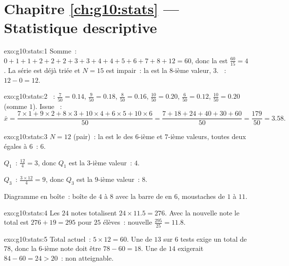 \section*{Chapitre \ref{ch:g10:stats} --- Statistique descriptive}

\begin{solution}{exo:g10:stats:1}
Somme~: $0+1+1+2+2+2+3+3+4+4+5+6+7+8+12 = 60$, donc la  est
$\frac{60}{15} = 4$. La série est déjà triée et $N = 15$ est impair~: la
 est la $8$-ième valeur, $3$. ~: $12 - 0 = 12$.
\end{solution}

\begin{solution}{exo:g10:stats:2}
~: $\frac{7}{50} = 0.14$, $\frac{9}{50} = 0.18$,
$\frac{8}{50} = 0.16$, $\frac{10}{50} = 0.20$, $\frac{6}{50} = 0.12$,
$\frac{10}{50} = 0.20$ (somme $1$). Issue ~:
\[
\bar x = \frac{7 \times 1 + 9 \times 2 + 8 \times 3 + 10 \times 4
+ 6 \times 5 + 10 \times 6}{50}
= \frac{7 + 18 + 24 + 40 + 30 + 60}{50}
= \frac{179}{50} = 3.58 .
\]
\end{solution}

\begin{solution}{exo:g10:stats:3}
$N = 12$ (pair)~: la  est le  des $6$-ième et $7$-ième
valeurs, toutes deux égales à $6$~:  $6$.

$Q_1$~: $\frac{12}{4} = 3$, donc $Q_1$ est la $3$-ième valeur~: $4$.

$Q_3$~: $\frac{3 \times 12}{4} = 9$, donc $Q_3$ est la $9$-ième
valeur~: $8$.

Diagramme en boîte~: boîte de $4$ à $8$ avec la barre de  en $6$,
moustaches de $1$ à $11$.
\end{solution}

\begin{solution}{exo:g10:stats:4}
Les $24$ notes totalisent $24 \times 11.5 = 276$. Avec la nouvelle note
le total est $276 + 19 = 295$ pour $25$ élèves~: nouvelle 
$\frac{295}{25} = 11.8$.
\end{solution}

\begin{solution}{exo:g10:stats:5}
Total actuel~: $5 \times 12 = 60$. Une  de $13$ sur $6$ tests
exige un total de $78$, donc la $6$-ième note doit être $78 - 60 = 18$.
Une  de $14$ exigerait $84 - 60 = 24 > 20$~: non atteignable.
\end{solution}

